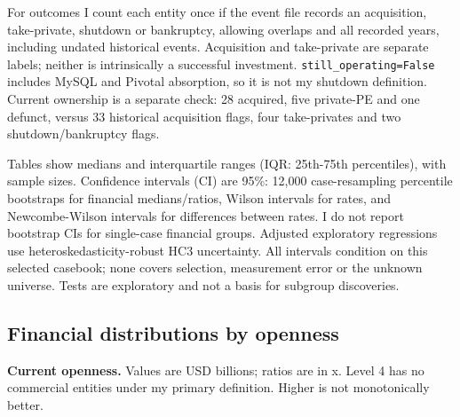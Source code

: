 For outcomes I count each entity once if the event file records an
acquisition, take-private, shutdown or bankruptcy, allowing overlaps and
all recorded years, including undated historical events. Acquisition and
take-private are separate labels; neither is intrinsically a successful
investment. \texttt{still\_operating=False} includes MySQL and Pivotal
absorption, so it is not my shutdown definition. Current ownership is a
separate check: 28 acquired, five private-PE and one defunct, versus 33
historical acquisition flags, four take-privates and two
shutdown/bankruptcy flags.

Tables show medians and interquartile ranges (IQR: 25th-75th
percentiles), with sample sizes. Confidence intervals (CI) are 95\%:
12,000 case-resampling percentile bootstraps for financial
medians/ratios, Wilson intervals for rates, and Newcombe-Wilson
intervals for differences between rates. I do not report bootstrap CIs
for single-case financial groups. Adjusted exploratory regressions use
heteroskedasticity-robust HC3 uncertainty. All intervals condition on
this selected casebook; none covers selection, measurement error or the
unknown universe. Tests are exploratory and not a basis for subgroup
discoveries.

\subsection{Financial distributions by
openness}\label{financial-distributions-by-openness}

\textbf{Current openness.} Values are USD billions; ratios are in x.
Level 4 has no commercial entities under my primary definition. Higher
is not monotonically better.

